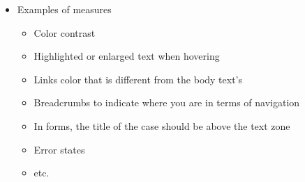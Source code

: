 \begin{itemize}
\item Examples of measures
\begin{itemize}
\item Color contrast
\item Highlighted or enlarged text when hovering
\item Links color that is different from the body text's
\item Breadcrumbs to indicate where you are in terms of navigation
\item In forms, the title of the case should be above the text zone
\item Error states
\item etc.
\end{itemize}
\end{itemize}

